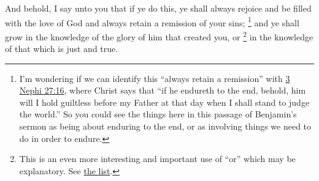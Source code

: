 			And behold, I say unto you that if ye do this,
			ye shall always rejoice and be filled with the love of God
			and always retain a remission of your sins;%
				\footnote{%
					I'm wondering if we can identify this ``always retain a remission'' with \hyperref[3NEPHI-27-16]{3 Nephi 27:16}, where Christ says that ``if he endureth to the end, behold, him will I hold guiltless before my Father at that day when I shall stand to judge the world.'' So you could see the things here in this passage of Benjamin's sermon as being about enduring to the end, or as involving things we need to do in order to endure.
					}
			and ye shall grow in the knowledge of the glory of him that created you,
			or%
				\footnote{%
					\label{MOSIAH-4-12-NOTE-or}%
					This is an even more interesting and important use of ``or'' which may be explanatory. See \hyperref[OR-COMMENTARY-explanatory]{the list}.
					}
			in the knowledge of that which is just and true.%
